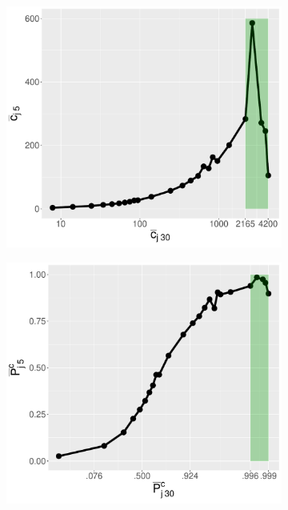 \begin{figure}[ht!]
\begin{subfigure}[b]{0.48\textwidth}
         \caption{}
         \label{fig:pred_rp_age}
     \end{subfigure}
     \hfill
     \begin{subfigure}[b]{0.48\textwidth}
         \centering
         \includegraphics[width=\textwidth]{figures/pred_power/ncit_vs_pubrp/cit_cit.pdf}
         \caption{}
         \label{fig:pred_cit_cit}
     \end{subfigure}
     \hfill
     \begin{subfigure}[b]{0.48\textwidth}
         \centering
         \includegraphics[width=\textwidth]{figures/pred_power/ncit_vs_pubrp/rp_rp.pdf}

\end{subfigure}
\end{figure}
